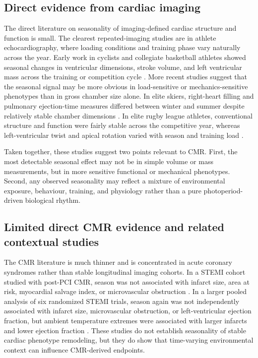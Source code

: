 \subsection*{Direct evidence from cardiac imaging}

The direct literature on seasonality of imaging-defined cardiac structure and function is small. The clearest repeated-imaging studies are in athlete echocardiography, where loading conditions and training phase vary naturally across the year. Early work in cyclists and collegiate basketball athletes showed seasonal changes in ventricular dimensions, stroke volume, and left ventricular mass across the training or competition cycle \cite{Fagard1983,Crouse1992}. More recent studies suggest that the seasonal signal may be more obvious in load-sensitive or mechanics-sensitive phenotypes than in gross chamber size alone. In elite skiers, right-heart filling and pulmonary ejection-time measures differed between winter and summer despite relatively stable chamber dimensions \cite{Dernovoj2022}. In elite rugby league athletes, conventional structure and function were fairly stable across the competitive year, whereas left-ventricular twist and apical rotation varied with season and training load \cite{Forsythe2023}.

Taken together, these studies suggest two points relevant to CMR. First, the most detectable seasonal effect may not be in simple volume or mass measurements, but in more sensitive functional or mechanical phenotypes. Second, any observed seasonality may reflect a mixture of environmental exposure, behaviour, training, and physiology rather than a pure photoperiod-driven biological rhythm.

\subsection*{Limited direct CMR evidence and related contextual studies}

The CMR literature is much thinner and is concentrated in acute coronary syndromes rather than stable longitudinal imaging cohorts. In a STEMI cohort studied with post-PCI CMR, season was not associated with infarct size, area at risk, myocardial salvage index, or microvascular obstruction \cite{Park2019}. In a larger pooled analysis of six randomized STEMI trials, season again was not independently associated with infarct size, microvascular obstruction, or left-ventricular ejection fraction, but ambient temperature extremes were associated with larger infarcts and lower ejection fraction \cite{Redfors2022}. These studies do not establish seasonality of stable cardiac phenotype remodeling, but they do show that time-varying environmental context can influence CMR-derived endpoints.

